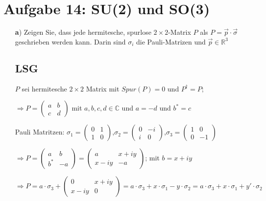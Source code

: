 



\section*{Aufgabe 14: SU(2) und SO(3)}

\begin{enumerate}
\item[\textbf{a})] Zeigen Sie, dass jede hermitesche, spurlose \(2\times 2\)-Matrix \(P\) als \(P=\vec p \cdot \vec \sigma\) geschrieben werden kann. Darin sind \( \sigma_i\) die Pauli-Matrizen und \(\vec p \in \mathbb R^3\)

\subsection*{LSG}

\(P\) sei hermitesche \(2\times 2\) Matrix mit \(Spur(P)=0\) und \(P^\dagger=P\);

\(\Rightarrow P=\begin{pmatrix} a&b\\c&d\end{pmatrix}\) mit \(a,b,c,d\in\mathbb C\) und \(a=-d\) und \(b^* = c\)

Pauli Matritzen: \(\sigma_1=\begin{pmatrix} 0&1\\1&0\end{pmatrix}\),\(\sigma_2=\begin{pmatrix} 0&-i\\i&0\end{pmatrix}\),\(\sigma_3=\begin{pmatrix} 1&0\\0&-1\end{pmatrix}\)

\(\Rightarrow P=\begin{pmatrix} a&b\\b^*&-a\end{pmatrix} =\begin{pmatrix} a&x+iy\\x-iy&-a\end{pmatrix} \); mit \(b = x+iy\)


\(\Rightarrow P=a\cdot\sigma_3 + \begin{pmatrix} 0&x+iy\\x-iy&0\end{pmatrix}= a\cdot \sigma_3 +x\cdot\sigma_1-y\cdot\sigma_2 = a\cdot \sigma_3 +x\cdot\sigma_1+y'\cdot\sigma_2 \)


\end{enumerate}
